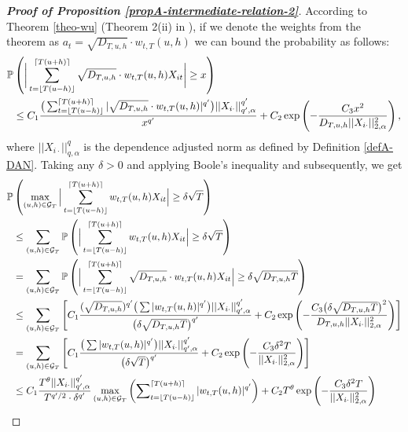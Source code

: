 \documentclass[a4paper,12pt]{article}
\makeatletter
\renewcommand{\eqref}[1]{\tagform@{\ref{#1}}}
\makeatother
\begin{document}
\begin{proof}[\textnormal{\textbf{Proof of Proposition \ref{propA-intermediate-relation-2}}}]
According to Theorem \ref{theo-wu} (Theorem 2(ii) in \cite{Wu2016}), if we denote the weights from the theorem as $a_t = \sqrt{D_{T, u, h}}\cdot w_{t,T}(u,h)$ we can bound the probability as follows:
\begin{align}\label{ineq-diff-8}
\begin{split}
\mathbb{P}&\left(\bigg| \sum_{t=\lfloor T(u-h) \rfloor}^{\lceil T(u+h) \rceil} \sqrt{D_{T, u, h}}\cdot w_{t,T}(u,h)X_{it}  \bigg| \geq x\right) \\
&\leq C_1 \frac{\big( \sum_{t=\lfloor T(u-h) \rfloor}^{\lceil T(u+h) \rceil} |\sqrt{D_{T, u, h}}\cdot w_{t,T}(u,h)|^{q^\prime}\big) ||X_{i\cdot}||^{q^\prime}_{q^\prime, \alpha}}{ x^{q^\prime}} + C_2 \exp \left(-\frac{C_3  x^2}{D_{T, u, h}||X_{i\cdot}||^{2}_{2, \alpha}}\right),
\end{split}
\end{align}
where $||X_{i\cdot}||^{q}_{q, \alpha}$ is the dependence adjusted norm as defined by Definition \ref{defA-DAN}. Taking any $\delta>0$ and applying Boole's inequality and \eqref{ineq-diff-8} subsequently, we get
\begin{align*}
\pr&\left(\max_{(u, h) \in \mathcal{G}_T} \Big| \sum_{t=\lfloor T(u-h) \rfloor}^{\lceil T(u+h) \rceil} w_{t,T}(u,h)X_{it}  \Big| \geq \delta \sqrt{T} \right) \\
&\leq \sum_{(u, h) \in \mathcal{G}_T} \pr \left( \Big| \sum_{t=\lfloor T(u-h) \rfloor}^{\lceil T(u+h) \rceil} w_{t,T}(u,h)X_{it}  \Big| \geq \delta \sqrt{T} \right) \\
&= \sum_{(u, h) \in \mathcal{G}_T} \pr \left( \Big| \sum_{t=\lfloor T(u-h) \rfloor}^{\lceil T(u+h) \rceil} \sqrt{D_{T, u, h}}\cdot w_{t,T}(u,h)X_{it}  \Big| \geq \delta\sqrt{D_{T, u, h}T}  \right)  \\
&\leq \sum_{(u, h) \in \mathcal{G}_T} \left[C_1 \frac{(\sqrt{D_{T, u, h}})^{q^\prime}\big( \sum |w_{t,T}(u,h)|^{q^\prime}\big) ||X_{i\cdot}||^{q^\prime}_{q^\prime, \alpha}}{ \big(\delta\sqrt{D_{T, u, h}T}\big)^{q^\prime}} + C_2 \exp \left(-\frac{C_3 \big(\delta\sqrt{D_{T, u, h}T}\big)^2}{D_{T, u, h}||X_{i\cdot}||^{2}_{2, \alpha}}\right) \right] \\
&= \sum_{(u, h) \in \mathcal{G}_T} \left[C_1 \frac{\big( \sum |w_{t,T}(u,h)|^{q^\prime}\big) ||X_{i\cdot}||^{q^\prime}_{q^\prime, \alpha}}{ \big(\delta \sqrt{T}\big)^{q^\prime}} + C_2 \exp \left(-\frac{C_3 \delta^2 T }{||X_{i\cdot}||^{2}_{2, \alpha}}\right) \right] \\
&\leq C_1 \frac{ T^\theta ||X_{i\cdot}||^{q^\prime}_{q^\prime, \alpha}}{T^{q^\prime/2}\cdot \delta^{q^\prime}} \max_{(u, h) \in \mathcal{G}_T} \left( \sum\nolimits_{t=\lfloor T(u-h) \rfloor}^{\lceil T(u+h) \rceil} |w_{t,T}(u,h)|^{q^\prime}\right)+ C_2 T^\theta \exp \left(-\frac{C_3 \delta^2 T}{||X_{i\cdot}||^{2}_{2, \alpha}}\right) \\

\end{align*}
\end{proof}
\end{document}
